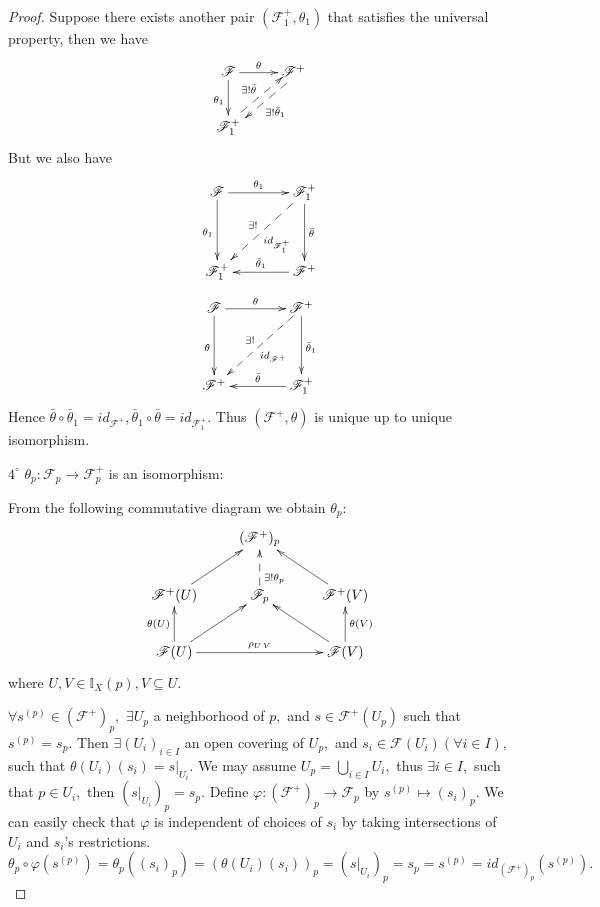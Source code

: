 \begin{proof}
Suppose there exists another pair $(\mathscr{F}^+_1, \theta_1)$ that
satisfies the universal property, then we have
\[ \xymatrix{
   \mathscr{F} \ar[r]^-{\theta} \ar[d]_{\theta_1} &
   \mathscr{F}^+ \ar@{-->}@<.6ex>"2,1"^{\exists! \bar{\theta}_1} \\
   \mathscr{F}^+_1 \ar@{-->}@<.6ex>"1,2"^{\exists! \bar{\theta}} }  \]
But we also have
\[ \xymatrix@C=4em@R=4em{
   \mathscr{F} \ar[r]^-{\theta_1} \ar[d]_{\theta_1} &
   \mathscr{F}^+_1 \ar[d]^{\bar{\theta}}
   \ar@{-->}[dl]_{\exists!}^{id_{\mathscr{F}^+_1}}   \\
   \mathscr{F}^+_1 & \mathscr{F}^+ \ar[l]_-{\bar{\theta}_1} }  \]
\[ \xymatrix@C=4em@R=4em{
   \mathscr{F} \ar[r]^-{\theta} \ar[d]_{\theta} & \mathscr{F}^+
   \ar[d]^{\bar{\theta}_1} \ar@{-->}[dl]_{\exists!}^{id_{\mathscr{F}^+}} \\
   \mathscr{F}^+ & \mathscr{F}^+_1 \ar[l]_-{\bar{\theta}} } \]
Hence $\bar{\theta}\circ\bar{\theta}_1=id_{\mathscr{F}^+},
\bar{\theta}_1\circ\bar{\theta}=id_{\mathscr{F}^+_1}.$ Thus
$(\mathscr{F}^+,\theta)$ is unique up to unique isomorphism.

$\mathit{4^{\circ}}$ $\theta_p: \mathscr{F}_p\rightarrow
\mathscr{F}_p^+$ is an isomorphism:

From the following commutative diagram we obtain $\theta_p:$
\[ \xymatrix{
   & (\mathscr{F}^+)_p \\
   \mathscr{F}^+(U) \ar[ur] & \mathscr{F}_p \ar@{-->}[u]_(.3){\exists!
   \theta_p} & \mathscr{F}^+(V) \ar[ul]               \\
   \mathscr{F}(U) \ar[u]^{\theta(U)} \ar[ur] \ar[rr]^-{\rho_{U\,V}} &
   & \mathscr{F}(V) \ar[ul] \ar[u]_{\theta(V)} }  \]
where $U,V\in \mathds{I}_X(p), V\subseteq U.$

$\forall s^{(p)}\in (\mathscr{F}^+)_p,$ $\exists U_p$ a neighborhood
of $p,$ and $s\in \mathscr{F}^+(U_p)$ such that $s^{(p)}=s_p.$ Then
$\exists (U_i)_{i\in I}$ an open covering of $U_p,$ and $s_i\in
\mathscr{F}(U_i)(\forall i\in I),$ such that
$\theta(U_i)(s_i)=\left.s\right|_{U_i}.$ We may assume
$U_p=\bigcup\limits_{i\in I}U_i,$ thus $\exists i\in I,$ such that
$p\in U_i,$ then $(\left.s\right|_{U_i})_p=s_p.$ Define $\varphi:
(\mathscr{F}^+)_p\rightarrow \mathscr{F}_p$ by $s^{(p)}\mapsto
(s_i)_p.$ We can easily check that $\varphi$ is independent of
choices of $s_i$ by taking intersections of $U_i$ and $s_i$'s
restrictions.
$$\theta_p\circ\varphi(s^{(p)}) = \theta_p((s_i)_p) =
(\theta(U_i)(s_i))_p = (\left.s\right|_{U_i})_p = s_p = s^{(p)} =
id_{(\mathscr{F}^+)_p}(s^{(p)}).$$


\end{proof}
